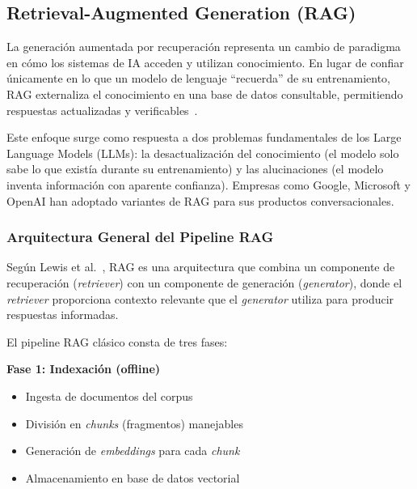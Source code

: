 \subsection{Retrieval-Augmented Generation (RAG)}
\label{subsec:rag}

La generaci\'on aumentada por recuperaci\'on representa un cambio de paradigma en c\'omo los sistemas de IA acceden y utilizan conocimiento. En lugar de confiar \'unicamente en lo que un modelo de lenguaje ``recuerda'' de su entrenamiento, RAG externaliza el conocimiento en una base de datos consultable, permitiendo respuestas actualizadas y verificables~\cite{lewis2020rag}.

Este enfoque surge como respuesta a dos problemas fundamentales de los Large Language Models (LLMs): la desactualizaci\'on del conocimiento (el modelo solo sabe lo que exist\'ia durante su entrenamiento) y las alucinaciones (el modelo inventa informaci\'on con aparente confianza). Empresas como Google, Microsoft y OpenAI han adoptado variantes de RAG para sus productos conversacionales.

\subsubsection{Arquitectura General del Pipeline RAG}
\label{subsubsec:pipeline-rag}

Seg\'un Lewis et al.~\cite{lewis2020rag}, RAG es una arquitectura que combina un componente de recuperaci\'on (\textit{retriever}) con un componente de generaci\'on (\textit{generator}), donde el \textit{retriever} proporciona contexto relevante que el \textit{generator} utiliza para producir respuestas informadas.

El pipeline RAG cl\'asico consta de tres fases:


\textbf{Fase 1: Indexaci\'on (offline)}
\begin{itemize}
    \item Ingesta de documentos del corpus
    \item Divisi\'on en \textit{chunks} (fragmentos) manejables
    \item Generaci\'on de \textit{embeddings} para cada \textit{chunk}
    \item Almacenamiento en base de datos vectorial
\end{itemize}

